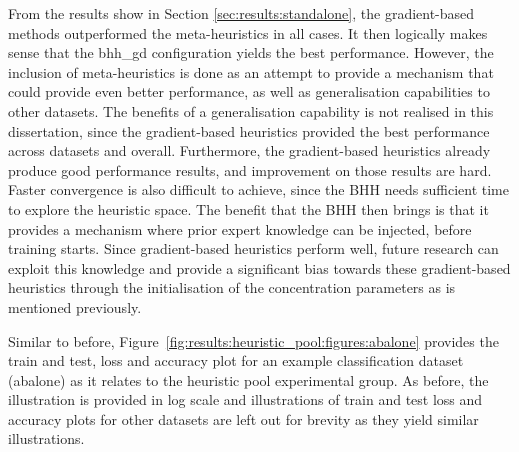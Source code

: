 From the results show in Section \ref{sec:results:standalone}, the gradient-based methods outperformed the meta-heuristics in all cases. It then logically makes sense that the bhh\_gd configuration yields the best performance. However, the inclusion of meta-heuristics is done as an attempt to provide a mechanism that could provide even better performance, as well as generalisation capabilities to other datasets. The benefits of a generalisation capability is not realised in this dissertation, since the gradient-based heuristics provided the best performance across datasets and overall. Furthermore, the gradient-based heuristics already produce good performance results, and improvement on those results are hard. Faster convergence is also difficult to achieve, since the \acs{BHH} needs sufficient time to explore the heuristic space. The benefit that the \acs{BHH} then brings is that it provides a mechanism where prior expert knowledge can be injected, before training starts. Since gradient-based heuristics perform well, future research can exploit this knowledge and provide a significant bias towards these gradient-based heuristics through the initialisation of the concentration parameters as is mentioned previously.

Similar to before, Figure~\ref{fig:results:heuristic_pool:figures:abalone} provides the train and test, loss and accuracy plot for an example classification dataset (abalone) as it relates to the heuristic pool experimental group. As before, the illustration is provided in log scale and illustrations of train and test loss and accuracy plots for other datasets are left out for brevity as they yield similar illustrations.

